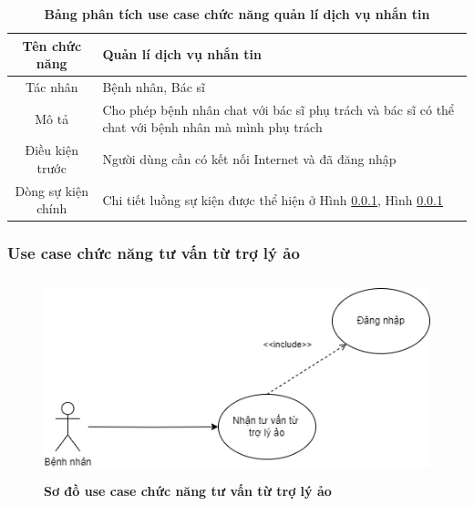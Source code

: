   \begin{table}[H]
    \caption{\bfseries \fontsize{12pt}{0pt}\selectfont Bảng phân tích use case chức năng quản lí dịch vụ nhắn tin}
    \centering
    \begin{tabularx}{0.9\textwidth}{|c|X|}
      \hline
      \textbf{Tên chức năng} & \textbf{Quản lí dịch vụ nhắn tin} \\
      \hline
      Tác nhân & Bệnh nhân, Bác sĩ \\
      \hline
      Mô tả & Cho phép bệnh nhân chat với bác sĩ phụ trách và bác sĩ có thể chat với bệnh nhân mà mình phụ trách \\
      \hline
      Điều kiện trước & Người dùng cần có kết nối Internet và đã đăng nhập \\
      \hline
      Dòng sự kiện chính & 
        Chi tiết luồng sự kiện được thể hiện ở Hình \ref{}, Hình \ref{} 
        \\
      \hline
    \end{tabularx}
  \end{table}

\subsubsection{Use case chức năng tư vấn từ trợ lý ảo}
  \begin{figure}[H]
    \centering
    \includegraphics[width=12.5cm,height=5.8cm]{Images/use_case/use_case_chatbot.png}
    \caption[Sơ đồ use case chức năng tư vấn từ trợ lý ảo]{\bfseries \fontsize{12pt}{0pt}
    \selectfont Sơ đồ use case chức năng tư vấn từ trợ lý ảo}
    \label{use_case_chat_with_bot} %
  \end{figure}


